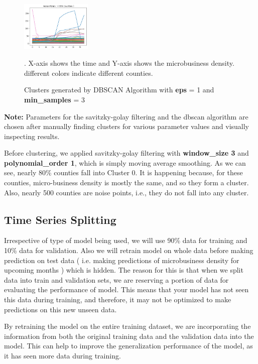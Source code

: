 \documentclass{article}
\begin{document}
\begin{figure}[h]
	\includegraphics[width=0.3\textwidth]{images/noise}
	\caption{Clusters generated by DBSCAN Algorithm with \textbf{eps} = 1 and \textbf{min\_samples} = 3}. X-axis shows the time and Y-axis shows the microbusiness density. different colors indicate different counties. 
\end{figure}

\textbf{Note: }Parameters for the savitzky-golay filtering and the dbscan algorithm are chosen after manually finding clusters for various parameter values and visually inspecting results. 

\vspace{1em}
Before clustering, we applied savitzky-golay filtering with \textbf{window\_size 3} and\textbf{ polynomial\_order 1}, which is simply moving average smoothing. As we can see, nearly 80\% counties fall into Cluster 0. It is happening because, for these counties, micro-business density is mostly the same, and so they form a cluster. Also, nearly 500 counties are noise points, i.e., they do not fall into any cluster. 

\subsection{Time Series Splitting}

\vspace{1em}
Irrespective of type of model being used, we will use 90\% data for training and 10\% data for validation. Also we will retrain model on whole data before making prediction on test data ( i.e. making predictions of microbusiness density for upcoming months ) which is hidden. The reason for this is that when we split data into train and validation sets, we are reserving a portion of data for evaluating the performance of model. This means that your model has not seen this data during training, and therefore, it may not be optimized to make predictions on this new unseen data.

\vspace{1em}
By retraining the model on the entire training dataset, we are incorporating the information from both the original training data and the validation data into the model. This can help to improve the generalization performance of the model, as it has seen more data during
training.
\end{document}
